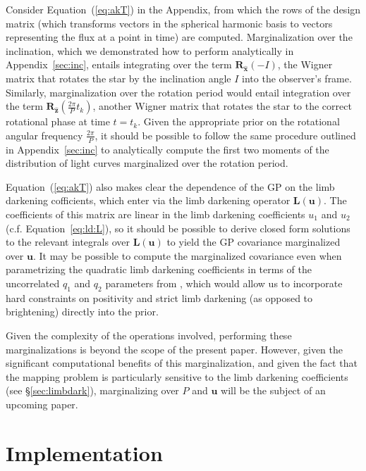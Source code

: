 \documentclass[modern]{aastex62}
\begin{document}
Consider Equation~(\ref{eq:akT}) in the Appendix, from which the rows of the
design matrix (which transforms vectors in the spherical harmonic basis to vectors
representing the flux at a point in time) are computed. Marginalization over the
inclination, which we demonstrated how to perform analytically in
Appendix~\ref{sec:inc}, entails integrating over the term
$\mathbf{R}_{\hat{\mathbf{x}}}\left(-I\right)$, the Wigner matrix that rotates
the star by the inclination angle $I$ into the observer's frame.
Similarly, marginalization over the
rotation period would entail integration over the term
$\mathbf{R}_{\hat{\mathbf{z}}}\left(\frac{2\pi}{P} t_k\right)$, another
Wigner matrix that rotates the star to the correct rotational phase at
time $t = t_k$. Given the appropriate prior on the rotational angular
frequency $\frac{2\pi}{P}$, it should be possible to follow the same
procedure outlined in Appendix~\ref{sec:inc} to analytically
compute the first two moments of the distribution of light curves marginalized over the
rotation period.

Equation~(\ref{eq:akT}) also makes clear the dependence of the GP on
the limb darkening cofficients, which enter via the limb darkening
operator $\mathbf{L}(\mathbf{u})$. The coefficients
of this matrix are linear in the limb darkening coefficients $u_1$ and $u_2$
(c.f. Equation~\ref{eq:ld:L}), so it should be possible to derive closed
form solutions to the relevant integrals over $\mathbf{L}(\mathbf{u})$ to
yield the GP covariance marginalized over $\mathbf{u}$. It may be
possible to compute the marginalized covariance even when parametrizing
the quadratic limb darkening
coefficients in terms of the uncorrelated $q_1$ and $q_2$ parameters from
\citet{?}, which would allow us to incorporate hard constraints on positivity
and strict limb darkening (as opposed to brightening) directly into the prior.

Given the complexity of the operations involved,
performing these marginalizations is beyond the scope of the present paper.
However, given the significant computational benefits of this marginalization,
and given the fact that the mapping problem is particularly sensitive to
the limb darkening coefficients (see \S\ref{sec:limbdark}), marginalizing over
$P$ and $\mathbf{u}$ will be the subject of an upcoming paper.

\section{Implementation}
\label{sec:implementation}
\end{document}
